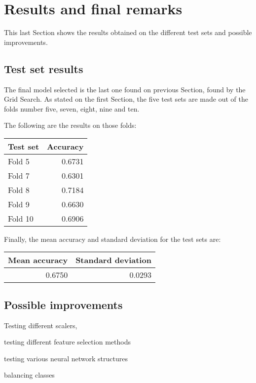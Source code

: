 \section{Results and final remarks}
\label{results}

This last Section shows the results obtained on the different 
test sets and possible improvements.

\subsection{Test set results}
The final model selected is the last one found on previous Section, 
found by the Grid Search.
As stated on the first Section, the five test sets are made out of the 
folds number five, seven, eight, nine and ten. 

The following are the results on those folds:

\begin{center}
    \begin{tabular}{ |l|r| } 
        \hline
        Test set & Accuracy\\
        \hline
        Fold 5 & 0.6731 \\
        Fold 7 & 0.6301 \\
        Fold 8 & 0.7184 \\
        Fold 9 & 0.6630 \\
        Fold 10 & 0.6906 \\ 
        \hline
    \end{tabular}
\end{center}

Finally, the mean accuracy and standard deviation for the test sets are: 
\begin{center}
    \begin{tabular}{ |r|r| } 
        \hline
        Mean accuracy & Standard deviation\\
        \hline
        0.6750 & 0.0293 \\
        \hline
    \end{tabular}
\end{center}

\subsection{Possible improvements}

Testing different scalers, 

testing different feature selection methods

testing various neural network structures

balancing classes